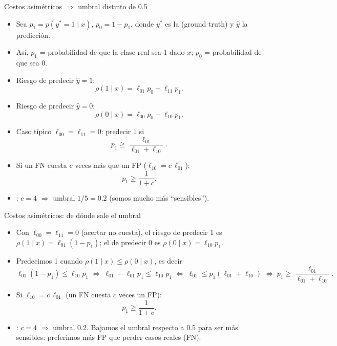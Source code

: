 \begin{frame}{Costos asimétricos \(\Rightarrow\) umbral distinto de 0.5}
\small
\begin{itemize}
  \item Sea \(p_1 = p(y^*=1\mid x)\), \(p_0 = 1-p_1\), donde \(y^*\) es la  (ground truth) y \(\hat{y}\) la predicción.
  \item Así, \(p_1\) = probabilidad de que la clase real sea 1 dado \(x\); \(p_0\) = probabilidad de que sea 0.
  \item Riesgo de predecir \(\hat{y}=1\):
  \[
    \rho(1\mid x) = \ell_{01}p_0 + \ell_{11}p_1.
  \]
  \item Riesgo de predecir \(\hat{y}=0\):
  \[
    \rho(0\mid x) = \ell_{00}p_0 + \ell_{10}p_1.
  \]
  \item Caso típico \(\ell_{00}=\ell_{11}=0\): predecir \(1\) si
  \[
    p_1 \ge \frac{\ell_{01}}{\ell_{01}+\ell_{10}}.
  \]
  \item Si un FN cuesta \(c\) veces más que un FP (\(\ell_{10}=c\,\ell_{01}\)):
  \[
    p_1 \ge \frac{1}{1+c}.
  \]
  \item {}: \(c=4\) \(\Rightarrow\) umbral \(1/5=0.2\) (somos mucho más “sensibles”).
\end{itemize}
\end{frame}

\begin{frame}{Costos asimétricos: de dónde sale el umbral}
\small
\begin{itemize}
  \item Con \(\ell_{00}=\ell_{11}=0\) (acertar no cuesta), el riesgo de predecir 1 es
    \(\rho(1\mid x)=\ell_{01}(1-p_1)\); el de predecir 0 es \(\rho(0\mid x)=\ell_{10}p_1\).
  \item Predecimos 1 cuando \(\rho(1\mid x)\le\rho(0\mid x)\), es decir
    \[
      \ell_{01}(1-p_1) \le \ell_{10}p_1
      \;\Longleftrightarrow\;
      \ell_{01} - \ell_{01}p_1 \le \ell_{10}p_1
      \;\Longleftrightarrow\;
      \ell_{01} \le p_1(\ell_{01}+\ell_{10})
      \;\Longleftrightarrow\;
      p_1 \ge \frac{\ell_{01}}{\ell_{01}+\ell_{10}}.
    \]
  \item Si \(\ell_{10}=c\,\ell_{01}\) (un FN cuesta \(c\) veces un FP):
    \[
      p_1 \ge \frac{1}{1+c}.
    \]
  \item {}: \(c=4\) \(\Rightarrow\) umbral 0.2. Bajamos el umbral respecto a 0.5 para ser más sensibles: preferimos más FP que perder casos reales (FN).
\end{itemize}
\end{frame}

